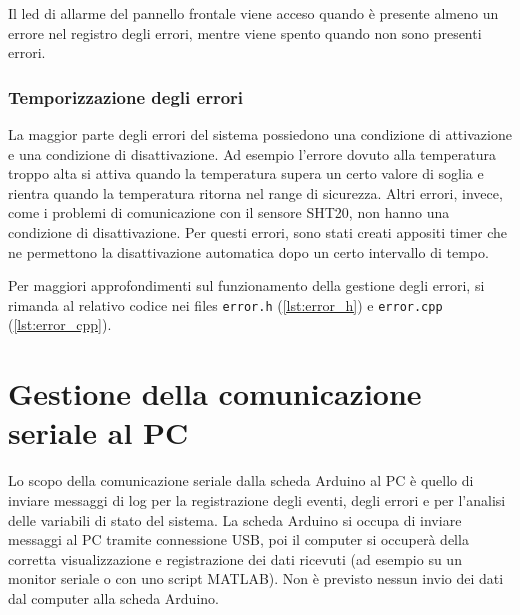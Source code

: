 Il led di allarme del pannello frontale viene acceso quando è presente almeno un errore nel registro degli errori, mentre
viene spento quando non sono presenti errori.

\subsubsection{Temporizzazione degli errori}
La maggior parte degli errori del sistema possiedono una condizione di attivazione e una condizione di disattivazione. Ad
esempio l'errore dovuto alla temperatura troppo alta si attiva quando la temperatura supera un certo valore di soglia e
rientra quando la temperatura ritorna nel range di sicurezza. Altri errori, invece, come i problemi di comunicazione con
il sensore SHT20, non hanno una condizione di disattivazione. Per questi errori, sono stati creati appositi timer che ne
permettono la disattivazione automatica dopo un certo intervallo di tempo.

Per maggiori approfondimenti sul funzionamento della gestione degli errori, si rimanda al relativo codice nei files
\verb|error.h| (\autoref{lst:error_h}) e \verb|error.cpp| (\autoref{lst:error_cpp}).

\section{Gestione della comunicazione seriale al PC}
Lo scopo della comunicazione seriale dalla scheda Arduino al PC è quello di inviare messaggi di log per la registrazione
degli eventi, degli errori e per l'analisi delle variabili di stato del sistema. La scheda Arduino si occupa di inviare
messaggi al PC tramite connessione USB, poi il computer si occuperà della corretta visualizzazione e registrazione dei
dati ricevuti (ad esempio su un monitor seriale o con uno script MATLAB). Non è previsto nessun invio dei dati dal computer
alla scheda Arduino.

